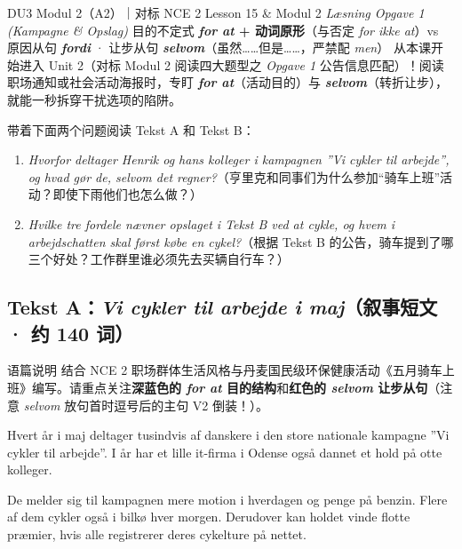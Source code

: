 {DU3 Modul 2（A2）｜对标 NCE 2 Lesson 15 \& Modul 2 \textit{Læsning Opgave 1 (Kampagne \& Opslag)}}
{目的不定式 \textbf{\textit{for at} + 动词原形}（与否定 \textit{for ikke at}）vs 原因从句 \textbf{\textit{fordi}} · 让步从句 \textbf{\textit{selvom}}（虽然……但是……，严禁配 \textit{men}）}
{从本课开始进入 Unit 2（对标 Modul 2 阅读四大题型之 \textit{Opgave 1} 公告信息匹配）！阅读职场通知或社会活动海报时，专盯 \textbf{\textit{for at}}（活动目的）与 \textbf{\textit{selvom}}（转折让步），就能一秒拆穿干扰选项的陷阱。}

\begin{foerduleaeser}
带着下面两个问题阅读 Tekst A 和 Tekst B：
\begin{enumerate}
  \item \textit{Hvorfor deltager Henrik og hans kolleger i kampagnen ”Vi cykler til arbejde”, og hvad gør de, selvom det regner?}（亨里克和同事们为什么参加“骑车上班”活动？即使下雨他们也怎么做？）
  \item \textit{Hvilke tre fordele nævner opslaget i Tekst B ved at cykle, og hvem i arbejdschatten skal først købe en cykel?}（根据 Tekst B 的公告，骑车提到了哪三个好处？工作群里谁必须先去买辆自行车？）
\end{enumerate}
\end{foerduleaeser}


\subsection*{Tekst A：\textit{Vi cykler til arbejde i maj}（叙事短文 · 约 140 词）}

\begin{tipbox}{语篇说明}
结合 NCE 2 职场群体生活风格与丹麦国民级环保健康活动《五月骑车上班》编写。请重点关注\textbf{\color{NCDNavy}深蓝色的 \textit{for at} 目的结构}和\textbf{\color{NCDRed}红色的 \textit{selvom} 让步从句}（注意 \textit{selvom} 放句首时逗号后的主句 V2 倒装！）。
\end{tipbox}

Hvert år i maj deltager tusindvis af danskere i den store nationale kampagne ”Vi cykler til arbejde”. I år har et lille it-firma i Odense også dannet et hold på otte kolleger.

De melder sig til kampagnen  mere motion i hverdagen og  penge på benzin. Flere af dem cykler også  i bilkø hver morgen. Derudover kan holdet vinde flotte præmier, hvis alle registrerer deres cykelture på nettet.


